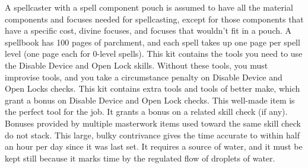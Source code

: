  A spellcaster with a spell component pouch is assumed to have all the material components and focuses needed for spellcasting, except for those components that have a specific cost, divine focuses, and focuses that wouldn't fit in a pouch.
 A spellbook has 100 pages of parchment, and each spell takes up one page per spell level (one page each for 0-level spells).
 This kit contains the tools you need to use the Disable Device and Open Lock skills. Without these tools, you must improvise tools, and you take a  circumstance penalty on Disable Device and Open Locks checks.
 This kit contains extra tools and tools of better make, which grant a  bonus on Disable Device and Open Lock checks.
 This well-made item is the perfect tool for the job. It grants a  bonus on a related skill check (if any). Bonuses provided by multiple masterwork items used toward the same skill check do not stack.
 This large, bulky contrivance gives the time accurate to within half an hour per day since it was last set. It requires a source of water, and it must be kept still because it marks time by the regulated flow of droplets of water.

